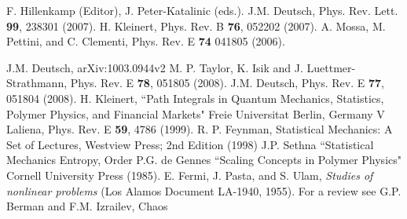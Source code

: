 \documentclass[11pt]{ucthesis}
\begin{document}
\begin{thebibliography}{}
 F. Hillenkamp (Editor), J. Peter-Katalinic (eds.). 
 J.M. Deutsch, Phys. Rev. Lett. {\bf 99}, 238301 (2007).
 H. Kleinert, Phys. Rev. B {\bf76}, 052202 (2007). 
 A. Mossa, M. Pettini, and C. Clementi, Phys. Rev. E {\bf 74} 041805 (2006).

 J.M. Deutsch, arXiv:1003.0944v2 
 M. P. Taylor, K. Isik and J. Luettmer-Strathmann,  Phys. Rev. E {\bf 78}, 051805  (2008).
 J.M. Deutsch, Phys. Rev. E {\bf 77}, 051804 (2008).
 H. Kleinert, ``Path Integrals in Quantum Mechanics, Statistics, Polymer Physics, and Financial Markets" Freie Universitat Berlin, Germany
 V Laliena, Phys. Rev. E {\bf 59}, 4786 (1999).
 R. P. Feynman, Statistical Mechanics: A Set of Lectures, Westview Press; 2nd Edition (1998)
 J.P. Sethna ``Statistical Mechanics Entropy, Order
 P.G. de Gennes ``Scaling Concepts in Polymer Physics" Cornell University Press (1985).
 E. Fermi, J. Pasta, and S. Ulam, {\em Studies of nonlinear problems} 
(Los Alamos Document LA-1940, 1955).
 For a review see G.P. Berman and F.M. Izrailev, Chaos





\end{thebibliography}
\end{document}
